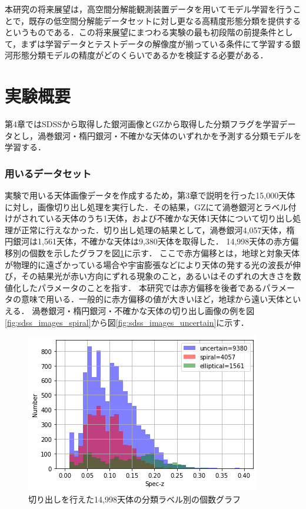 \documentclass[a4j, 11pt]{jreport}
\begin{document}
本研究の将来展望は，高空間分解能観測装置データを用いてモデル学習を行うことで，既存の低空間分解能データセットに対し更なる高精度形態分類を提供するというものである．この将来展望にまつわる実験の最も初段階の前提条件として，まずは学習データとテストデータの解像度が揃っている条件にて学習する銀河形態分類モデルの精度がどのくらいであるかを検証する必要がある．

\section{実験概要}
第4章ではSDSSから取得した銀河画像とGZから取得した分類フラグを学習データとし，渦巻銀河・楕円銀河・不確かな天体のいずれかを予測する分類モデルを学習する．

\subsubsection{用いるデータセット}
実験で用いる天体画像データを作成するため，第3章で説明を行った15,000天体に対し，画像切り出し処理を実行した．その結果，GZにて渦巻銀河とラベル付けがされている天体のうち1天体，および不確かな天体1天体について切り出し処理が正常に行えなかった．切り出し処理の結果として，渦巻銀河4,057天体，楕円銀河は1,561天体，不確かな天体は9,380天体を取得した．
14,998天体の赤方偏移別の個数を示したグラフを図\ref{fig:z_15000}に示す．
ここで赤方偏移とは，地球と対象天体が物理的に遠ざかっている場合や宇宙膨張などにより天体の発する光の波長が伸び，その結果光が赤い方向にずれる現象のこと，あるいはそのずれの大きさを数値化したパラメータのことを指す．
本研究では赤方偏移を後者であるパラメータの意味で用いる．一般的に赤方偏移の値が大きいほど，地球から遠い天体といえる．
渦巻銀河・楕円銀河・不確かな天体の切り出し画像の例を図\ref{fig:sdss_images_spiral}から図\ref{fig:sdss_images_uncertain}に示す．

\begin{figure}[H]
 \centering
 \includegraphics[width=1\hsize]{images/z_15000_0_040_kesson.png}
 \caption{切り出しを行えた14,998天体の分類ラベル別の個数グラフ}
 \label{fig:z_15000}
\end{figure}
\end{document}

